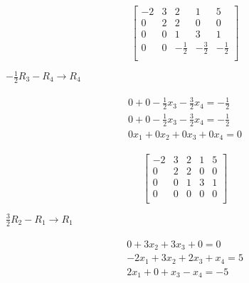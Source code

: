 \documentclass[12pt letter]{report}
\begin{document}
{\begin{enumerate}
          \[
            \begin{bmatrix}
              -2 & 3 & 2            & 1            & 5            \\
              0  & 2 & 2            & 0            & 0            \\
              0  & 0 & 1            & 3            & 1            \\
              0  & 0 & -\frac{1}{2} & -\frac{3}{2} & -\frac{1}{2} \\
            \end{bmatrix}
          \]

          $-\frac{1}{2}R_3 - R_4 \to R_4$

          \begin{align*}
            \begin{split}
              0 + 0 - \frac{1}{2}x_3 - \frac{3}{2}x_4 = -\frac{1}{2} \\
              0 + 0-\frac{1}{2}x_3 - \frac{3}{2}x_4 = -\frac{1}{2}   \\
              \hline
              0x_1 + 0x_2 + 0x_3 + 0x_4 = 0
            \end{split}
          \end{align*}

          \[
            \begin{bmatrix}
              -2 & 3 & 2 & 1 & 5 \\
              0  & 2 & 2 & 0 & 0 \\
              0  & 0 & 1 & 3 & 1 \\
              0  & 0 & 0 & 0 & 0 \\
            \end{bmatrix}
          \]

          $\frac{3}{2}R_2 - R_1 \to R_1$

          \begin{align*}
            \begin{split}
              0 + 3x_2 + 3x_3 + 0 = 0      \\
              -2x_1 + 3x_2+ 2x_3 + x_4 = 5 \\
              \hline
              2x_1 + 0 + x_3 - x_4 = -5
            \end{split}
          \end{align*}


\end{enumerate}}
\end{document}
